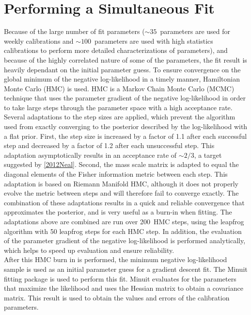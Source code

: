 \documentclass[/main.tex]{subfiles}
\begin{document}
\section{Performing a Simultaneous Fit} \label{sec:fitter}
Because of the large number of fit parameters ($\sim35$~parameters are used for weekly calibrations and $\sim100$~parameters are used with high statistics calibrations to perform more detailed characterizations of parameters), and because of the highly correlated nature of some of the parameters, the fit result is heavily dependant on the initial parameter guess.
To ensure convergence on the global minimum of the negative log-likelihood in a timely manner, Hamiltonian Monte Carlo (HMC) is used\cite{DUANE1987}\cite{2012Neal}.
HMC is a Markov Chain Monte Carlo (MCMC) technique that uses the parameter gradient of the negative log-likelihood in order to take large steps through the parameter space with a high acceptance rate.
Several adaptations to the step sizes are applied, which prevent the algorithm used from exactly converging to the posterior described by the log-likelihood with a flat prior.
First, the step size is increased by a factor of 1.1 after each successful step and decreased by a factor of 1.2 after each unsuccessful step.
This adaptation asymptotically results in an acceptance rate of $\sim2/3$, a target suggested by \ref{2012Neal}.
Second, the mass scale matrix is adapted to equal the diagonal elements of the Fisher information metric between each step.
This adaptation is based on Riemann Manifold HMC\cite{Girolami2011}, although it does not properly evolve the metric between steps and will therefore fail to converge exactly.
The combination of these adaptations results in a quick and reliable convergence that approximates the posterior, and is very useful as a burn-in when fitting.
The adaptations above are combined are run over 200~HMC steps, using the leapfrog algorithm with 50 leapfrog steps for each HMC step.
In addition, the evaluation of the parameter gradient of the negative log-likelihood is performed analytically, which helps to speed up evaluation and ensure reliability.
\\
After this HMC burn in is performed, the minimum negative log-likelihood sample is used as an initial parameter guess for a gradient descent fit.
The Minuit fitting package is used to perform this fit\cite{minuit}.
Minuit evaluates for the parameters that maximize the likelihood and uses the Hessian matrix to obtain a covariance matrix.
This result is used to obtain the values and errors of the calibration parameters.
\\
\end{document}
